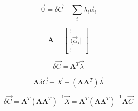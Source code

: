 \documentclass[aps,12pt]{revtex4}
\begin{document}
\begin{equation}
	\vec 0 = \delta \vec C - \sum_i \lambda_i \vec\alpha_i
\end{equation}

\begin{equation}
	\bm{A} = 
	\begin{bmatrix}
	\vdots\\
	\langle \vec \alpha_i \vert \\
	\vdots
	\end{bmatrix}
\end{equation}

\begin{equation}
	\delta \vec C = \bm{A}^T \vec \lambda
\end{equation}

\begin{equation}
	\bm{A} \delta \vec C = \vec X = \left(\bm{A} \bm{A}^T\right) \vec\lambda
\end{equation}

\begin{equation}
	\delta \vec{C} = \bm{A}^T \left(\bm{A} \bm{A}^T\right)^{-1} \vec{X} = \bm{A}^T \left(\bm{A} \bm{A}^T\right)^{-1} \bm{A} \vec{C}
\end{equation}
\end{document}
